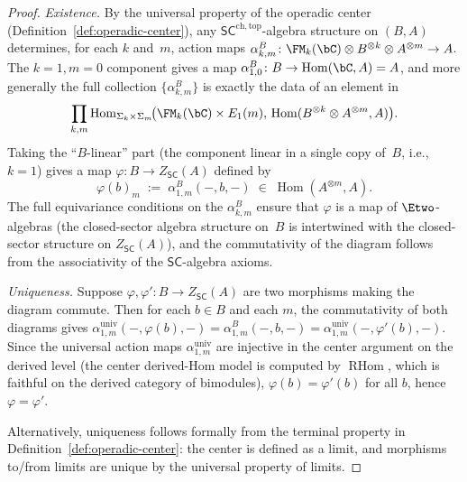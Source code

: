 \begin{proof}
\emph{Existence.}
By the universal property of the operadic center
(Definition~\ref{def:operadic-center}), any
$\mathsf{SC}^{\mathrm{ch,top}}$-algebra structure on $(B, A)$
determines, for each $k$ and~$m$, action maps
$\alpha^B_{k,m}\colon \FM_k(\bC) \otimes B^{\otimes k}
\otimes A^{\otimes m} \to A$.
The $k = 1, m = 0$ component gives a map
$\alpha^B_{1,0}\colon B \to \operatorname{Hom}(\bC, A) = A$, and
more generally the full collection $\{\alpha^B_{k,m}\}$ is
exactly the data of an element in
\[
\prod_{k,m}
\operatorname{Hom}_{\Sigma_k \times \Sigma_m}
\!\bigl(
\FM_k(\bC) \times E_1(m),\,
\operatorname{Hom}(B^{\otimes k} \otimes A^{\otimes m}, A)
\bigr).
\]
Taking the ``$B$-linear'' part (the component linear in a single
copy of~$B$, i.e., $k = 1$) gives a map
$\varphi\colon B \to Z_{\mathsf{SC}}(A)$ defined by
\[
\varphi(b)_m
\;:=\;
\alpha^B_{1,m}(-, b, -)
\;\in\;
\operatorname{Hom}(A^{\otimes m}, A).
\]
The full equivariance conditions on the $\alpha^B_{k,m}$ ensure that
$\varphi$ is a map of $\Etwo$-algebras (the closed-sector algebra
structure on~$B$ is intertwined with the closed-sector structure on
$Z_{\mathsf{SC}}(A)$), and the commutativity of the diagram follows
from the associativity of the $\mathsf{SC}$-algebra axioms.

\emph{Uniqueness.}
Suppose $\varphi, \varphi'\colon B \to Z_{\mathsf{SC}}(A)$ are two
morphisms making the diagram commute. Then for each $b \in B$ and
each $m$, the commutativity of both diagrams gives
$\alpha^{\mathrm{univ}}_{1,m}(-, \varphi(b), -) = \alpha^B_{1,m}(-, b, -)
= \alpha^{\mathrm{univ}}_{1,m}(-, \varphi'(b), -)$.
Since the universal action maps
$\alpha^{\mathrm{univ}}_{1,m}$ are injective in the center argument on the derived
level (the center derived-Hom model is computed by
$\operatorname{RHom}$, which is faithful on the derived category of
bimodules), $\varphi(b) = \varphi'(b)$ for all $b$,
hence $\varphi = \varphi'$.

Alternatively, uniqueness follows formally from the terminal property
in Definition~\ref{def:operadic-center}: the center is defined as a
limit, and morphisms to/from limits are unique by the universal
property of limits.
\end{proof}

